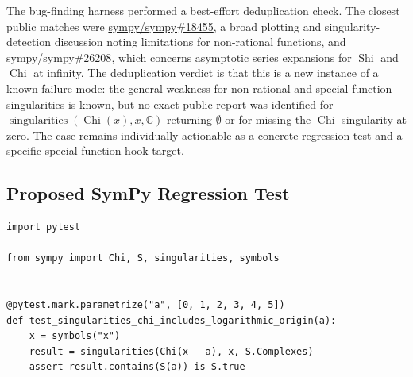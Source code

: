 \documentclass[11pt]{article}
\begin{document}
The bug-finding harness performed a best-effort deduplication check. The closest
public matches were \href{https://github.com/sympy/sympy/issues/18455}{sympy/sympy\#18455},
a broad plotting and singularity-detection discussion noting limitations for
non-rational functions, and
\href{https://github.com/sympy/sympy/issues/26208}{sympy/sympy\#26208}, which
concerns asymptotic series expansions for \(\operatorname{Shi}\) and
\(\operatorname{Chi}\) at infinity. The deduplication verdict is that this is a
new instance of a known failure mode: the general weakness for non-rational and
special-function singularities is known, but no exact public report was
identified for \(\operatorname{singularities}(\operatorname{Chi}(x),x,\mathbb{C})\)
returning \(\emptyset\) or for missing the \(\operatorname{Chi}\) singularity at
zero. The case remains individually actionable as a concrete regression test
and a specific special-function hook target.

\subsection{Proposed SymPy Regression Test}

\medskip

\begin{lstlisting}[style=bugpython]
import pytest

from sympy import Chi, S, singularities, symbols


@pytest.mark.parametrize("a", [0, 1, 2, 3, 4, 5])
def test_singularities_chi_includes_logarithmic_origin(a):
    x = symbols("x")
    result = singularities(Chi(x - a), x, S.Complexes)
    assert result.contains(S(a)) is S.true
\end{lstlisting}
\end{document}
